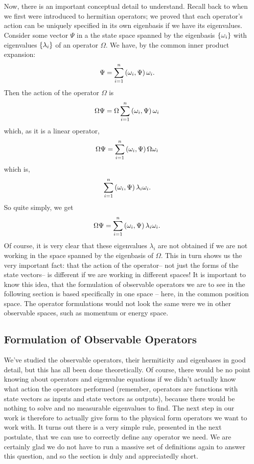 \\\\
Now, there is an important conceptual detail to understand. Recall back to when we first were introduced to hermitian operators; we proved that each operator's action can be uniquely specified in its own eigenbasis if we have its eigenvalues. Consider some vector $\Psi$ in a the state space spanned by the eigenbasis $\{\omega_{i}\}$ with eigenvalues $\{\lambda_{i}\}$ of an operator $\Omega$. We have, by the common inner product expansion:
$$
\Psi=\sum_{i=1}^{n}\left(\omega_{i},\Psi\right)\omega_{i}.
$$
Then the action of the operator $\Omega$ is 
$$
\Omega \Psi = \Omega\sum_{i=1}^{n}\left(\omega_{i},\Psi\right)\omega_{i}
$$
which, as it is a linear operator,
$$
\Omega\Psi=\sum_{i=1}^{n}\left(\omega_{i},\Psi\right)\Omega\omega_{i}
$$
which is,
$$
\sum_{i=1}^{n}\left(\omega_{i},\Psi\right)\lambda_{i}\omega_{i}.
$$
So quite simply, we get 
$$
\Omega \Psi = \sum_{i=1}^{n}\left(\omega_{i},\Psi\right)\lambda_{i}\omega_{i}.
$$
Of course, it is very clear that these eigenvalues $\lambda_{i}$ are not obtained if we are not working in the space spanned by the eigenbasis of $\Omega$. This in turn shows us the very important fact: that the action of the operator-- not just the forms of the state vectors-- is different if we are working in different spaces! It is important to know this idea, that the formulation of observable operators we are to see in the following section is based specifically in one space -- here, in the common position space. The operator formulations would not look the same were we in other observable spaces, such as momentum or energy space.
\subsection{Formulation of Observable Operators}
We've studied the observable operators, their hermiticity and eigenbases in good detail, but this has all been done theoretically. Of course, there would be no point knowing about operators and eigenvalue equations if we didn't actually know what action the operators performed (remember, operators are functions with state vectors as inputs and state vectors as outputs), because there would be nothing to solve and no measurable eigenvalues to find. The next step in our work is therefore to actually give form to the physical form operators we want to work with. It turns out there is a very simple rule, presented in the next postulate, that we can use to correctly define any operator we need. We are certainly glad we do not have to run a massive set of definitions again to answer this question, and so the section is duly and appreciatedly short.

